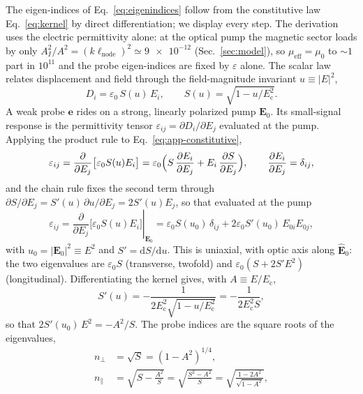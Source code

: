\documentclass[aps,prd,twocolumn,superscriptaddress,nofootinbib,longbibliography]{revtex4-2}
\newcommand{\Ec}{E_{\mathrm{c}}}
\begin{document}
The eigen-indices of Eq.~\eqref{eq:eigenindices} follow from the constitutive law
Eq.~\eqref{eq:kernel} by direct differentiation; we display every step. The
derivation uses the electric permittivity alone: at the optical pump the magnetic
sector loads by only $A_I^2/A^2=(k\ell_{\mathrm{node}})^2\simeq\num{9e-12}$
(Sec.~\ref{sec:model}), so $\mu_{\mathrm{eff}}=\mu_0$ to $\sim\!1$ part in
$10^{11}$ and the probe eigen-indices are fixed by $\varepsilon$ alone. The
scalar law relates displacement and field through the field-magnitude invariant
$u\equiv|E|^2$,
%
\begin{equation}
  D_i=\varepsilon_0\,S(u)\,E_i,\qquad S(u)=\sqrt{1-u/\Ec^2}.
  \label{eq:app-constitutive}
\end{equation}
%
A weak probe $\mathbf e$ rides on a strong, linearly polarized pump $\mathbf E_0$.
Its small-signal response is the permittivity tensor
$\varepsilon_{ij}=\partial D_i/\partial E_j$ evaluated at the pump. Applying the
product rule to Eq.~\eqref{eq:app-constitutive},
%
\begin{equation}
  \varepsilon_{ij}=\frac{\partial}{\partial E_j}
  \bigl[\varepsilon_0 S(u)E_i\bigr]
  =\varepsilon_0\Bigl(S\,\frac{\partial E_i}{\partial E_j}
  +E_i\,\frac{\partial S}{\partial E_j}\Bigr),
  \qquad\frac{\partial E_i}{\partial E_j}=\delta_{ij},
  \label{eq:app-productrule}
\end{equation}
%
and the chain rule fixes the second term through
$\partial S/\partial E_j=S'(u)\,\partial u/\partial E_j=2S'(u)E_j$, so that
evaluated at the pump
%
\begin{equation}
  \varepsilon_{ij}=\left.\frac{\partial}{\partial E_j}
  \bigl[\varepsilon_0 S(u)E_i\bigr]\right|_{\mathbf E_0}
  =\varepsilon_0 S(u_0)\,\delta_{ij}+2\varepsilon_0 S'(u_0)\,E_{0i}E_{0j},
  \label{eq:app-tensor}
\end{equation}
%
with $u_0=|\mathbf E_0|^2\equiv E^2$ and $S'=\mathrm dS/\mathrm du$. This is
uniaxial, with optic axis along $\hat{\mathbf E}_0$: the two eigenvalues are
$\varepsilon_0 S$ (transverse, twofold) and $\varepsilon_0(S+2S'E^2)$
(longitudinal). Differentiating the kernel gives, with $A\equiv E/\Ec$,
%
\begin{equation}
  S'(u)=-\frac{1}{2\Ec^2\sqrt{1-u/\Ec^2}}=-\frac{1}{2\Ec^2 S},
  \label{eq:app-Sprime}
\end{equation}
%
so that $2S'(u_0)\,E^2=-A^2/S$. The probe indices are the square roots of the
eigenvalues,
%
\begin{align}
  n_\perp&=\sqrt{S}=(1-A^2)^{1/4}, \label{eq:app-nperp}\\
  n_\parallel&=\sqrt{S-\frac{A^2}{S}}
  =\sqrt{\frac{S^2-A^2}{S}}
  =\sqrt{\frac{1-2A^2}{\sqrt{1-A^2}}}, \label{eq:app-npar}
\end{align}
\end{document}
